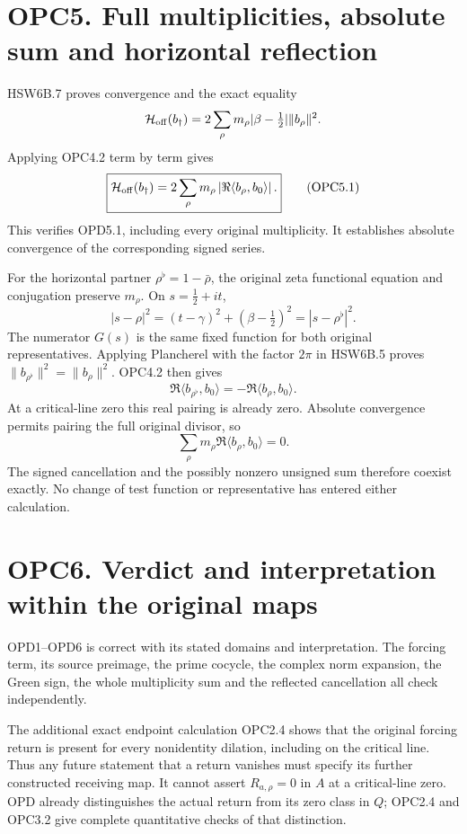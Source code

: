 \section{OPC5. Full multiplicities, absolute sum and horizontal
reflection}\label{opc5.-full-multiplicities-absolute-sum-and-horizontal-reflection}

HSW6B.7 proves convergence and the exact equality \[
\mathcal H_{\rm off}(b_\dagger)
=2\sum_\rho m_\rho|\beta-\tfrac12|\|b_\rho\|^2.
\] Applying OPC4.2 term by term gives \[
\boxed{\mathcal H_{\rm off}(b_\dagger)
=2\sum_\rho m_\rho
\left|\Re\langle b_\rho,b_0\rangle\right|.}
\tag{OPC5.1}
\] This verifies OPD5.1, including every original multiplicity. It
establishes absolute convergence of the corresponding signed series.

For the horizontal partner \(\rho^\flat=1-\bar\rho\), the original zeta
functional equation and conjugation preserve \(m_\rho\). On
\(s=\tfrac12+it\), \[
|s-\rho|^2=(t-\gamma)^2+(\beta-\tfrac12)^2
=|s-\rho^\flat|^2.
\] The numerator \(G(s)\) is the same fixed function for both original
representatives. Applying Plancherel with the factor \(2\pi\) in HSW6B.5
proves \(\|b_{\rho^\flat}\|^2=\|b_\rho\|^2\). OPC4.2 then gives \[
\Re\langle b_{\rho^\flat},b_0\rangle
=-\Re\langle b_\rho,b_0\rangle.
\] At a critical-line zero this real pairing is already zero. Absolute
convergence permits pairing the full original divisor, so \[
\sum_\rho m_\rho\Re\langle b_\rho,b_0\rangle=0.
\tag{OPC5.2}
\] The signed cancellation and the possibly nonzero unsigned sum
therefore coexist exactly. No change of test function or representative
has entered either calculation.

\section{OPC6. Verdict and interpretation within the original
maps}\label{opc6.-verdict-and-interpretation-within-the-original-maps}

OPD1--OPD6 is correct with its stated domains and interpretation. The
forcing term, its source preimage, the prime cocycle, the complex norm
expansion, the Green sign, the whole multiplicity sum and the reflected
cancellation all check independently.

The additional exact endpoint calculation OPC2.4 shows that the original
forcing return is present for every nonidentity dilation, including on
the critical line. Thus any future statement that a return vanishes must
specify its further constructed receiving map. It cannot assert
\(R_{a,\rho}=0\) in \(A\) at a critical-line zero. OPD already
distinguishes the actual return from its zero class in \(Q\); OPC2.4 and
OPC3.2 give complete quantitative checks of that distinction.

